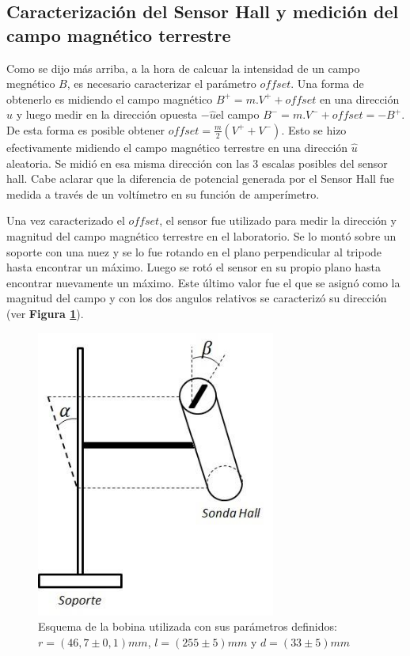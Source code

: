 \documentclass[11pt,a4paper]{article}
\begin{document}
\subsection{Caracterización del Sensor Hall y medición del campo magnético terrestre}

Como se dijo más arriba, a la hora de calcuar la intensidad de un campo megnético $B$, es necesario caracterizar el parámetro $offset$. Una forma de obtenerlo es midiendo el campo magnético $B^{+} = m.V^{+}+offset$ en una dirección $\widehat{u}$ y luego medir en la dirección opuesta $-\widehat{u}$el campo $B^{-} = m.V^{-}+offset=-B^{+}$. De esta forma es posible obtener $offset = \frac{m}{2}(V^{+}+V^{-})$. Esto se hizo efectivamente midiendo el campo magnético terrestre en una dirección $\widehat{u}$ aleatoria. Se midió en esa misma dirección con las 3 escalas posibles del sensor hall. Cabe aclarar que la diferencia de potencial generada por el Sensor Hall fue medida a través de un voltímetro en su función de amperímetro.

Una vez caracterizado el $offset$, el sensor fue utilizado para medir la dirección y magnitud del campo magnético terrestre en el laboratorio. Se lo montó sobre un soporte con una nuez y se lo fue rotando en el plano perpendicular al tripode hasta encontrar un máximo. Luego se rotó el sensor en su propio plano hasta encontrar nuevamente un máximo. Este último valor fue el que se asignó como la magnitud del campo y con los dos angulos relativos se caracterizó su dirección (ver \textbf{Figura \ref{fig:terrestre}}).


\begin{figure}[h!]
\centering
   \includegraphics[width=0.7\textwidth]{Terrestre}
   \caption{Esquema de la bobina utilizada con sus parámetros definidos: $r = (46,7 \pm 0,1)mm$, $l = (255 \pm 5)mm$ y $d = (33 \pm 5)mm$}  
   \label{fig:terrestre}
\end{figure}
\end{document}
